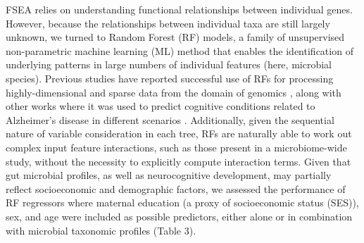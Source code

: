 \documentclass{article}
\begin{document}
FSEA relies on understanding functional relationships between individual
genes. However, because the relationships between individual taxa are
still largely unknown, we turned to Random Forest (RF) models, a family of 
unsupervised non-parametric machine learning (ML) method that enables
the identification of underlying patterns in large numbers of individual
features (here, microbial species). Previous studies have reported
successful use of RFs for processing highly-dimensional and sparse data
from the domain of genomics
\cite{amaratungaEnrichedRandomForests2008,brieucPracticalIntroductionRandom2018,chenRandomForestsGenomic2012,franzosaGutMicrobiomeStructure2019,stephanRandomForestApproach2015},
along with other works where it was used
to predict cognitive conditions related to Alzheimer's disease in
different scenarios
\cite{ardekaniPredictionIncipientAlzheimer2017,velazquezRandomForestModel2021}.
Additionally, given the sequential
nature of variable consideration in each tree, RFs are naturally able to
work out complex input feature interactions, such as those present in a
microbiome-wide study, without the necessity to explicitly compute
interaction terms.
Given that gut microbial profiles, as well as neurocognitive
development, may partially reflect socioeconomic and demographic
factors, we assessed the performance of RF regressors where maternal
education (a proxy of socioeconomic status (SES)), sex, and age were
included as possible predictors, either alone or in combination with
microbial taxonomic profiles (Table 3).
\end{document}
